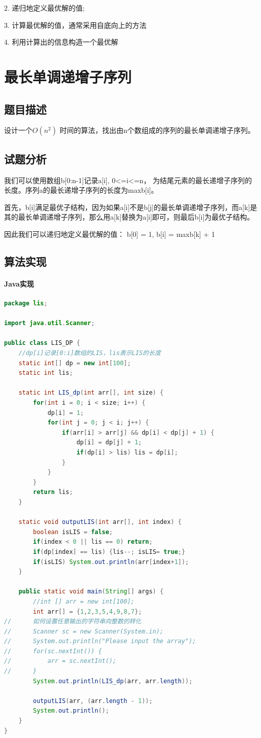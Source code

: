 \documentclass[UTF8]{ctexart}
\begin{document}
    2. 递归地定义最优解的值;

    3. 计算最优解的值，通常采用自底向上的方法

    4. 利用计算出的信息构造一个最优解

    \section{最长单调递增子序列}
    \subsection{题目描述}
    设计一个$O(n^2)$ 时间的算法，找出由n个数组成的序列的最长单调递增子序列。

    \subsection{试题分析}
    我们可以使用数组b[0:n-1]记录a[i], 0<=i<=n， 为结尾元素的最长递增子序列的长度。序列a的最长递增子序列的长度为max{b[i]}。

    首先，b[i]满足最优子结构，因为如果a[i]不是b[j]的最长单调递增子序列，而a[k]是其的最长单调递增子序列，那么用a[k]替换为a[i]即可，则最后b[i]为最优子结构。

    因此我们可以递归地定义最优解的值：
    b[0] = 1, b[i] = max{b[k]} + 1

    \subsection{算法实现}
    \paragraph{Java实现}

\begin{small}
\begin{lstlisting}[language=java]
package lis;

import java.util.Scanner;

public class LIS_DP {
	//dp[i]记录[0:i]数组的LIS，lis表示LIS的长度
	static int[] dp = new int[100];
	static int lis;
	
	static int LIS_dp(int arr[], int size) {
		for(int i = 0; i < size; i++) {
			dp[i] = 1;
			for(int j = 0; j < i; j++) {
				if(arr[i] > arr[j] && dp[i] < dp[j] + 1) {
					dp[i] = dp[j] + 1;
					if(dp[i] > lis) lis = dp[i];
				}
			}
		}
		return lis;
	}
	
	static void outputLIS(int arr[], int index) {
		boolean isLIS = false;
		if(index < 0 || lis == 0) return;
		if(dp[index] == lis) {lis--; isLIS= true;}
		if(isLIS) System.out.println(arr[index+1]);
	}
	
	public static void main(String[] args) {
		//int [] arr = new int[100];
		int arr[] = {1,2,3,5,4,9,8,7};
//		如何设置任意输出的字符串向整数的转化
//		Scanner sc = new Scanner(System.in);		
//		System.out.println("Please input the array");
//		for(sc.nextInt()) {
//			arr = sc.nextInt();
//		}
		System.out.println(LIS_dp(arr, arr.length));
		
		outputLIS(arr, (arr.length - 1));
		System.out.println();
	}
}
\end{lstlisting}
\end{small}
\end{document}
